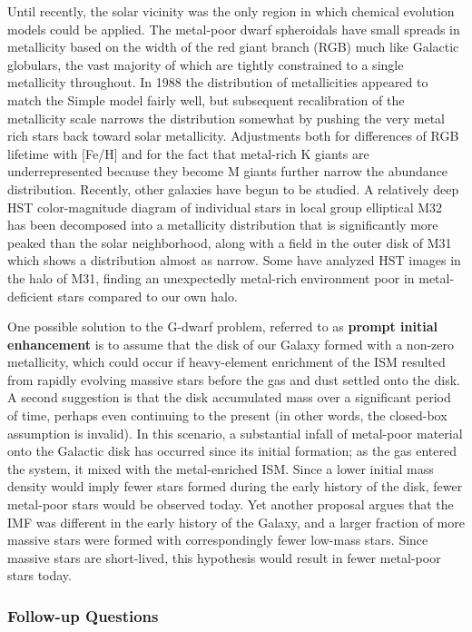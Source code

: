 \documentclass[a4paper,10pt]{article}
\begin{document}
{\noindent}Until recently, the solar vicinity was the only region in which chemical evolution models could be applied. The metal-poor dwarf spheroidals have small spreads in metallicity based on the width of the red giant branch (RGB) much like Galactic globulars, the vast majority of which are tightly constrained to a single metallicity throughout. In 1988 the distribution of metallicities appeared to match the Simple model fairly well, but subsequent recalibration of the metallicity scale narrows the distribution somewhat by pushing the very metal rich stars back toward solar metallicity. Adjustments both for differences of RGB lifetime with [Fe/H] and for the fact that metal-rich K giants are underrepresented because they become M giants further narrow the abundance distribution. Recently, other galaxies have begun to be studied. A relatively deep HST color-magnitude diagram of individual stars in local group elliptical M32 has been decomposed into a metallicity distribution that is significantly more peaked than the solar neighborhood, along with a field in the outer disk of M31 which shows a distribution almost as narrow. Some have analyzed HST images in the halo of M31, finding an unexpectedly metal-rich environment poor in metal-deficient stars compared to our own halo.

{\noindent}One possible solution to the G-dwarf problem, referred to as \textbf{prompt initial enhancement} is to assume that the disk of our Galaxy formed with a non-zero metallicity, which could occur if heavy-element enrichment of the ISM resulted from rapidly evolving massive stars before the gas and dust settled onto the disk. A second suggestion is that the disk accumulated mass over a significant period of time, perhaps even continuing to the present (in other words, the closed-box assumption is invalid). In this scenario, a substantial infall of metal-poor material onto the Galactic disk has occurred since its initial formation; as the gas entered the system, it mixed with the metal-enriched ISM. Since a lower initial mass density would imply fewer stars formed during the early history of the disk, fewer metal-poor stars would be observed today. Yet another proposal argues that the IMF was different in the early history of the Galaxy, and a larger fraction of more massive stars were formed with correspondingly fewer low-mass stars. Since massive stars are short-lived, this hypothesis would result in fewer metal-poor stars today.

\subsubsection{Follow-up Questions}
\end{document}
